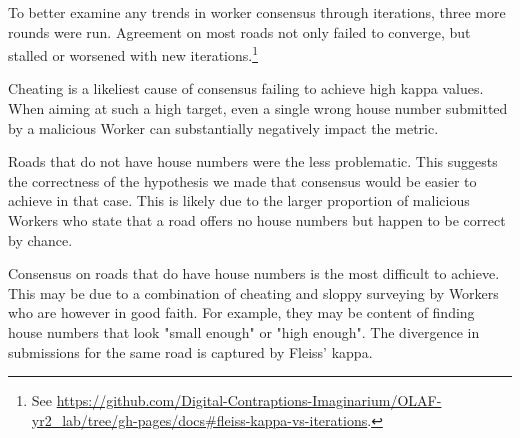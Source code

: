 To better examine any trends in worker consensus through iterations, three more rounds were run. Agreement on most roads not only failed to converge, but stalled or worsened with new iterations.\footnote{See \url{https://github.com/Digital-Contraptions-Imaginarium/OLAF-yr2_lab/tree/gh-pages/docs#fleiss-kappa-vs-iterations}.} 

Cheating is a likeliest cause of consensus failing to achieve high kappa values. When aiming at such a high target, even a single wrong house number submitted by a malicious Worker can substantially negatively impact the metric.

Roads that do not have house numbers were the less problematic. This suggests the correctness of the hypothesis we made that consensus would be easier to achieve in that case. This is likely due to the larger proportion of malicious Workers who state that a road offers no house numbers but happen to be correct by chance.

Consensus on roads that do have house numbers is the most difficult to achieve. This may be due to a combination of cheating and sloppy surveying by Workers who are however in good faith. For example, they may be content of finding house numbers that look "small enough" or "high enough". The divergence in submissions for the same road is captured by Fleiss' kappa.